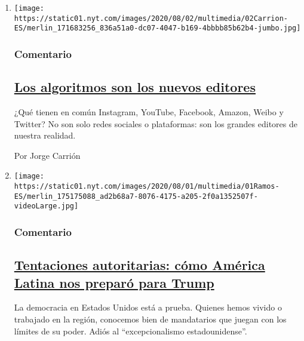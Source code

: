 \begin{enumerate}
\def\labelenumi{\arabic{enumi}.}
\item
  \texttt{[image: https://static01.nyt.com/images/2020/08/02/multimedia/02Carrion-ES/merlin\_171683256\_836a51a0-dc07-4047-b169-4bbbb85b62b4-jumbo.jpg]}

  \hypertarget{comentario}{%
  \subsubsection{Comentario}\label{comentario}}

  \hypertarget{los-algoritmos-son-los-nuevos-editores}{%
  \subsection{\texorpdfstring{\href{/es/2020/08/02/espanol/opinion/facebook-amazon-instagram.html}{Los
  algoritmos son los nuevos
  editores}}{Los algoritmos son los nuevos editores}}\label{los-algoritmos-son-los-nuevos-editores}}

  ¿Qué tienen en común Instagram, YouTube, Facebook, Amazon, Weibo y
  Twitter? No son solo redes sociales o plataformas: son los grandes
  editores de nuestra realidad.

  Por Jorge Carrión
\item
  \texttt{[image: https://static01.nyt.com/images/2020/08/01/multimedia/01Ramos-ES/merlin\_175175088\_ad2b68a7-8076-4175-a205-2f0a1352507f-videoLarge.jpg]}

  \hypertarget{comentario-1}{%
  \subsubsection{Comentario}\label{comentario-1}}

  \hypertarget{tentaciones-autoritarias-cuxf3mo-amuxe9rica-latina-nos-preparuxf3-para-trump}{%
  \subsection{\texorpdfstring{\href{/es/2020/08/01/espanol/opinion/trump-autoritarismo.html}{Tentaciones
  autoritarias: cómo América Latina nos preparó para
  Trump}}{Tentaciones autoritarias: cómo América Latina nos preparó para Trump}}\label{tentaciones-autoritarias-cuxf3mo-amuxe9rica-latina-nos-preparuxf3-para-trump}}

  La democracia en Estados Unidos está a prueba. Quienes hemos vivido o
  trabajado en la región, conocemos bien de mandatarios que juegan con
  los límites de su poder. Adiós al ``excepcionalismo estadounidense''.


\end{enumerate}
